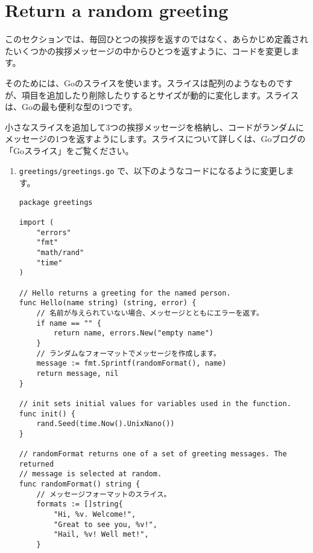 \section{Return a random greeting}

このセクションでは、毎回ひとつの挨拶を返すのではなく、あらかじめ定義されたいくつかの挨拶メッセージの中からひとつを返すように、コードを変更します。


そのためには、Goのスライスを使います。スライスは配列のようなものですが、項目を追加したり削除したりするとサイズが動的に変化します。スライスは、Goの最も便利な型の1つです。

小さなスライスを追加して3つの挨拶メッセージを格納し、コードがランダムにメッセージの1つを返すようにします。スライスについて詳しくは、Goブログの「Goスライス」をご覧ください。


\begin{enumerate}
\item \texttt{greetings/greetings.go} で、以下のようなコードになるように変更します。

\begin{lstlisting}[numbers=none]
package greetings

import (
    "errors"
    "fmt"
    "math/rand"
    "time"
)

// Hello returns a greeting for the named person.
func Hello(name string) (string, error) {
    // 名前が与えられていない場合、メッセージとともにエラーを返す。
    if name == "" {
        return name, errors.New("empty name")
    }
    // ランダムなフォーマットでメッセージを作成します。
    message := fmt.Sprintf(randomFormat(), name)
    return message, nil
}

// init sets initial values for variables used in the function.
func init() {
    rand.Seed(time.Now().UnixNano())
}

// randomFormat returns one of a set of greeting messages. The returned
// message is selected at random.
func randomFormat() string {
    // メッセージフォーマットのスライス。
    formats := []string{
        "Hi, %v. Welcome!",
        "Great to see you, %v!",
        "Hail, %v! Well met!",
    }


\end{lstlisting}
\end{enumerate}
